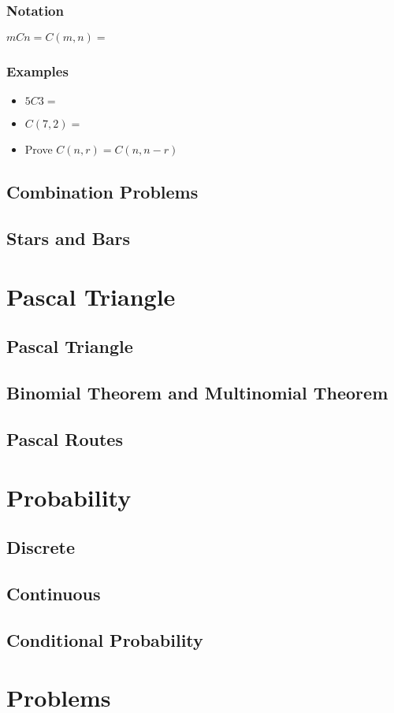 \documentclass{article}
\begin{document}
\subsubsection{Notation}
$mCn=C(m,n)=$
\subsubsection{Examples}
\begin{itemize}
    \item $5C3=$
    \item $C(7,2)=$
    \item Prove $C(n,r)=C(n,n-r)$ 
\end{itemize}
\pagebreak

\subsection{Combination Problems}


\subsection{Stars and Bars}

\section{Pascal Triangle}

\subsection{Pascal Triangle}

\subsection{Binomial Theorem and Multinomial Theorem}

\subsection{Pascal Routes}

\section{Probability}

\subsection{Discrete}

\subsection{Continuous}

\subsection{Conditional Probability}

\section{Problems}
\end{document}
